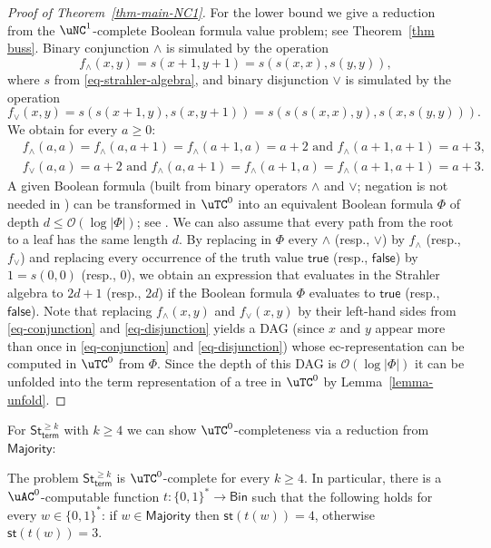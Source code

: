 \documentclass[a4paper,UKenglish,cleveref, autoref, thm-restate, numberwithinsect]{lipics-v2021}
\newcommand{\Bin}{\mathsf{Bin}}
\newcommand{\hs}{\mathsf{st}}
\newcommand{\StNk}{\mathsf{St}^{\ge k}}
\newcommand{\StNkterm}{\StNk_{\mathsf{term}}}
\begin{document}
\begin{proof}[Proof of Theorem~\ref{thm-main-NC1}]
For the lower bound we give a reduction from the $\uNC^1$-complete 
Boolean formula value problem; see Theorem~\ref{thm buss}. Binary conjunction $\wedge$ is simulated by the operation 
\begin{equation} \label{eq-conjunction}
f_\wedge(x,y) = s(x+1,y+1) = s(s(x,x),s(y,y)),
\end{equation}
where $s$ from \eqref{eq-strahler-algebra}, and binary disjunction $\vee$ is simulated by the operation
\begin{equation} \label{eq-disjunction}
f_\vee(x,y) = s(s(x+1,y),s(x,y+1)) = s(s(s(x,x),y),s(x,s(y,y))).
\end{equation}
We obtain for every $a \geq 0$:
\begin{align}
 & f_\wedge(a,a) = f_\wedge(a,a+1) = f_\wedge(a+1,a) = a+2 \text{ and } f_\wedge(a+1,a+1) = a+3, \label{eq-wedge} \\
 & f_\vee(a,a) = a+2 \text{ and } f_\wedge(a,a+1) = f_\wedge(a+1,a) =  f_\wedge(a+1,a+1) = a+3. \label{eq-vee}
\end{align} 
A given Boolean formula (built from binary operators $\wedge$ and $\vee$; negation is not needed in \cite{Bus87})
can be transformed in $\uTC^0$ into an equivalent Boolean formula $\Phi$ of depth
$d \leq \mathcal{O}(\log |\Phi|)$; see \cite{GanardiL19}.
We can also assume that every path from the root to a leaf has the same length $d$.
By replacing in $\Phi$ every $\wedge$ (resp., $\vee$)
by $f_\wedge$ (resp., $f_\vee$) and replacing 
every occurrence of the truth value $\mathsf{true}$ (resp., $\mathsf{false}$) by $1= s(0,0)$ (resp., $0$),
we obtain an expression that evaluates in the Strahler algebra to $2d+1$ (resp., $2d$) if the Boolean formula $\Phi$ evaluates to 
$\mathsf{true}$ (resp., $\mathsf{false}$). Note that replacing  $f_\wedge(x,y)$ and $f_\vee(x,y)$ by their left-hand sides
from \eqref{eq-conjunction} and \eqref{eq-disjunction}
yields a DAG (since $x$ and $y$ appear more than once in \eqref{eq-conjunction} and \eqref{eq-disjunction}) whose ec-representation can be computed in $\uTC^0$ from $\Phi$.
Since the depth of this DAG is $\mathcal{O}(\log |\Phi|)$ it can be unfolded into the 
term representation of a tree in $\uTC^0$ by Lemma~\ref{lemma-unfold}.
\end{proof}
For $\StNkterm$ with $k \geq 4$ we can show $\uTC^0$-completeness via a reduction from $\mathsf{Majority}$:
\begin{theorem} \label{theorem-uTC0}
The problem $\StNkterm$  is $\uTC^0$-complete  for every $k \geq 4$.
In particular, there is a $\uAC^0$-computable function $t : \{0,1\}^* \to \Bin$ such that the following holds for every $w \in \{0,1\}^*$:
if $w \in \mathsf{Majority}$ then $\hs(t(w)) = 4$, otherwise  $\hs(t(w)) = 3$.
\end{theorem}
\end{document}
